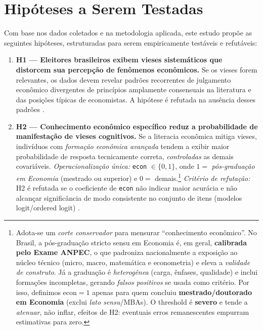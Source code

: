 \section{Hipóteses a Serem Testadas}
\label{sec:hipoteses}

Com base nos dados coletados e na metodologia aplicada, este estudo propõe as seguintes hipóteses, estruturadas para serem empiricamente testáveis e refutáveis:

\begin{enumerate}[label=\alph*)]

  \item \textbf{H1 — Eleitores brasileiros exibem vieses sistemáticos que distorcem sua percepção de fenômenos econômicos.} 
  Se os vieses forem relevantes, os dados devem revelar padrões recorrentes de julgamento econômico divergentes de princípios amplamente consensuais na literatura e das posições típicas de economistas. A hipótese é refutada na ausência desses padrões \cite{The_Myth_of_the_Rational_Voter,blendon1997}.

  \item \textbf{H2 — Conhecimento econômico específico reduz a probabilidade de manifestação de vieses cognitivos.} 
  Se a literacia econômica mitiga vieses, indivíduos com \emph{formação econômica avançada} tendem a exibir maior probabilidade de resposta tecnicamente correta, \emph{controladas} as demais covariáveis. 
  \textit{Operacionalização única:} \texttt{econ} $\in\{0,1\}$, onde $1 =$ \emph{pós-graduação em Economia} (mestrado ou superior) e $0 =$ demais.\footnote{Adota-se um \emph{corte conservador} para mensurar “conhecimento econômico”. No Brasil, a pós-graduação stricto sensu em Economia é, em geral, \textbf{calibrada pelo Exame ANPEC}, o que padroniza nacionalmente a exposição ao núcleo técnico (micro, macro, matemática e econometria) e eleva a \emph{validade de construto}. Já a graduação é \emph{heterogênea} (carga, ênfases, qualidade) e inclui formações incompletas, gerando \emph{falsos positivos} se usada como critério. Por isso, definimos $\mathrm{econ}=1$ apenas para quem concluiu \textbf{mestrado/doutorado em Economia} (exclui \emph{lato sensu}/MBAs). O threshold é \textbf{severo} e tende a \emph{atenuar}, não inflar, efeitos de H2: eventuais erros remanescentes empurram estimativas para zero.}
  \textit{Critério de refutação:} H2 é refutada se o coeficiente de \texttt{econ} não indicar maior acurácia e não alcançar significância de modo consistente no conjunto de itens (modelos logit/ordered logit) \cite{downs1957economic,Judgment_under_Uncertainty}.


\end{enumerate}
